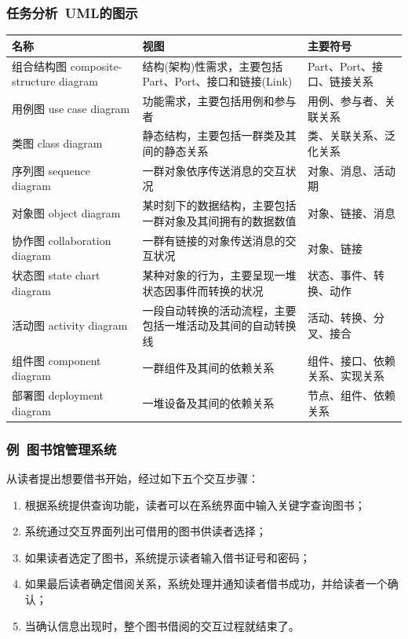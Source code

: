 \documentclass{beamer}
\begin{document}
\begin{frame}
	\frametitle{任务分析~{\small UML的图示}}
	\begin{tiny}
	\begin{tabular}{|p{}|p{}|p{}|}
	\hline 
	名称 & 视图 & 主要符号 \\ 
	\hline 
	组合结构图 composite-structure diagram & 结构(架构)性需求，主要包括Part、Port、接口和链接(Link) & Part、Port、接口、链接关系 \\ 
	\hline 
	用例图 use case diagram & 功能需求，主要包括用例和参与者 & 用例、参与者、关联关系 \\ 
	\hline 
	类图 class diagram & 静态结构，主要包括一群类及其间的静态关系 & 类、关联关系、泛化关系 \\ 
	\hline 
	序列图 sequence diagram & 一群对象依序传送消息的交互状况 & 对象、消息、活动期 \\ 
	\hline 
	对象图 object diagram & 某时刻下的数据结构，主要包括一群对象及其间拥有的数据数值 & 对象、链接、消息 \\ 
	\hline 
	协作图 collaboration diagram & 一群有链接的对象传送消息的交互状况 & 对象、链接 \\ 
	\hline 
	状态图 state chart diagram & 某种对象的行为，主要呈现一堆状态因事件而转换的状况 & 状态、事件、转换、动作 \\ 
	\hline 
	活动图 activity diagram & 一段自动转换的活动流程，主要包括一堆活动及其间的自动转换线 & 活动、转换、分叉、接合 \\ 
	\hline 
	组件图 component diagram & 一群组件及其间的依赖关系 & 组件、接口、依赖关系、实现关系 \\ 
	\hline 
	部署图 deployment diagram & 一堆设备及其间的依赖关系 & 节点、组件、依赖关系 \\ 
	\hline 
	\end{tabular} 
	\end{tiny}
\end{frame}

\begin{frame}
	\frametitle{例~{\small 图书馆管理系统}}
	从读者提出想要借书开始，经过如下五个交互步骤：
	\begin{enumerate}
		\item 根据系统提供查询功能，读者可以在系统界面中输入关键字查询图书；
		\item 系统通过交互界面列出可借用的图书供读者选择；
		\item 如果读者选定了图书，系统提示读者输入借书证号和密码；
		\item 如果最后读者确定借阅关系，系统处理并通知读者借书成功，并给读者一个确认；
		\item 当确认信息出现时，整个图书借阅的交互过程就结束了。
	\end{enumerate}
\end{frame}
\end{document}
